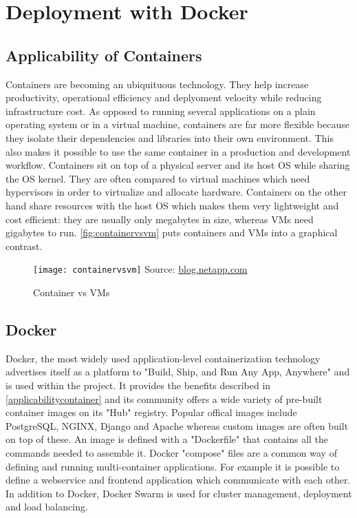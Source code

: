 \chapter[Deployment]{Deployment with Docker} \label{ch:deployment}

\section{Applicability of Containers} \label{applicabilitycontainer}
Containers are becoming an ubiquituous technology. They help increase productivity, operational efficiency and deplyoment velocity while reducing infrastructure cost. As opposed to running several applications on a plain operating system or in a virtual machine, containers are far more flexible because they isolate their dependencies and libraries into their own environment. This also makes it possible to use the same container in a production and development workflow. Containers sit on top of a physical server and its host OS while sharing the OS kernel. They are often compared to virtual machines which need hypervisors in order to virtualize and allocate hardware. Containers on the other hand share resources with the host OS which makes them very lightweight and cost efficient: they are usually only megabytes in size, whereas VMs need gigabytes to run. \autoref{fig:containervsvm} puts containers and VMs into a graphical contrast.

\begin{figure}[H]
    \begin{center}
    \texttt{[image: containervsvm]}
    Source: \href{https://blog.netapp.com/wp-content/uploads/2016/03/Screen-Shot-2018-03-20-at-9.24.09-AM-1024x548.png}{blog.netapp.com}
    \end{center}
    \caption{Container vs VMs}
    \label{fig:containervsvm}
\end{figure}
  

\section{Docker}
Docker, the most widely used application-level containerization technology advertises itself as a platform to "Build, Ship, and Run Any App, Anywhere" and is used within the project. It provides the benefits described in \autoref{applicabilitycontainer} and its community offers a wide variety of pre-built container images on its "Hub" registry. Popular offical images include PostgreSQL, NGINX, Django and Apache whereas custom images are often built on top of these. An image is defined with a "Dockerfile" that contains all the commands needed to assemble it. Docker "compose" files are a common way of defining and running multi-container applications. For example it is possible to define a webservice and frontend application which communicate with each other. In addition to Docker, Docker Swarm is used for cluster management, deployment and load balancing.

